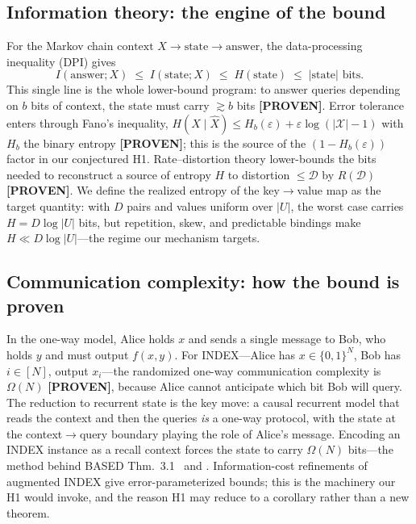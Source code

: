 \subsection{Information theory: the engine of the bound}
For the Markov chain $\text{context } X \rightarrow \text{state} \rightarrow \text{answer}$, the
data-processing inequality (DPI) gives
\begin{equation}
  I(\text{answer}; X) \;\le\; I(\text{state}; X) \;\le\; H(\text{state}) \;\le\; |\text{state}| \text{ bits}.
\end{equation}
This single line is the whole lower-bound program: to answer queries depending on $b$ bits of
context, the state must carry $\gtrsim b$ bits \textbf{[PROVEN]}. Error tolerance enters through
Fano's inequality, $H(X \mid \widehat{X}) \le H_b(\varepsilon) + \varepsilon \log(|\mathcal{X}|-1)$
with $H_b$ the binary entropy \textbf{[PROVEN]}; this is the source of the $(1 - H_b(\varepsilon))$
factor in our conjectured H1. Rate--distortion theory lower-bounds the bits needed to
reconstruct a source of entropy $H$ to distortion $\le \mathcal{D}$ by $R(\mathcal{D})$
\textbf{[PROVEN]}. We define the realized entropy of the key$\rightarrow$value map as the target
quantity: with $D$ pairs and values uniform over $|U|$, the worst case carries
$H = D \log |U|$ bits, but repetition, skew, and predictable bindings make $H \ll D\log|U|$---the
regime our mechanism targets.

\subsection{Communication complexity: how the bound is proven}
In the one-way model, Alice holds $x$ and sends a single message to Bob, who holds $y$ and must
output $f(x,y)$. For INDEX---Alice has $x \in \{0,1\}^N$, Bob has $i \in [N]$, output
$x_i$---the randomized one-way communication complexity is $\Omega(N)$
\citep{kremer1999randomized} \textbf{[PROVEN]}, because Alice cannot anticipate which bit Bob
will query. The reduction to recurrent state is the key move: a causal recurrent model that
reads the context and then the queries \emph{is} a one-way protocol, with the state at the
context$\rightarrow$query boundary playing the role of Alice's message. Encoding an INDEX
instance as a recall context forces the state to carry $\Omega(N)$ bits---the method behind
BASED Thm.~3.1~\citep{arora2024based} and \citet{wen2025rnns}. Information-cost refinements of
augmented INDEX give error-parameterized bounds; this is the machinery our H1 would invoke, and
the reason H1 may reduce to a corollary rather than a new theorem.
